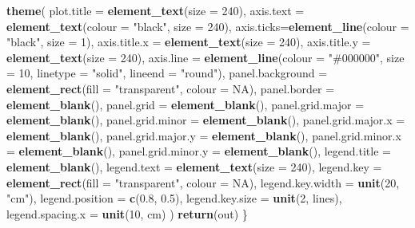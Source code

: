 \documentclass[
]{article}
\newenvironment{Shaded}{\begin{snugshade}}{\end{snugshade}}
\newcommand{\AttributeTok}[1]{\textcolor[rgb]{0.13,0.29,0.53}{#1}}
\newcommand{\ConstantTok}[1]{\textcolor[rgb]{0.56,0.35,0.01}{#1}}
\newcommand{\DecValTok}[1]{\textcolor[rgb]{0.00,0.00,0.81}{#1}}
\newcommand{\FloatTok}[1]{\textcolor[rgb]{0.00,0.00,0.81}{#1}}
\newcommand{\FunctionTok}[1]{\textcolor[rgb]{0.13,0.29,0.53}{\textbf{#1}}}
\newcommand{\NormalTok}[1]{#1}
\newcommand{\StringTok}[1]{\textcolor[rgb]{0.31,0.60,0.02}{#1}}
\begin{document}
\begin{Shaded}
\begin{Highlighting}[]
    \FunctionTok{theme}\NormalTok{(}
      \AttributeTok{plot.title =} \FunctionTok{element\_text}\NormalTok{(}\AttributeTok{size =} \DecValTok{240}\NormalTok{),}
      \AttributeTok{axis.text =} \FunctionTok{element\_text}\NormalTok{(}\AttributeTok{colour =} \StringTok{"black"}\NormalTok{, }\AttributeTok{size =} \DecValTok{240}\NormalTok{),}
      \AttributeTok{axis.ticks=}\FunctionTok{element\_line}\NormalTok{(}\AttributeTok{colour =} \StringTok{"black"}\NormalTok{, }\AttributeTok{size =} \DecValTok{1}\NormalTok{),}
      \AttributeTok{axis.title.x =} \FunctionTok{element\_text}\NormalTok{(}\AttributeTok{size =} \DecValTok{240}\NormalTok{),}
      \AttributeTok{axis.title.y =} \FunctionTok{element\_text}\NormalTok{(}\AttributeTok{size =} \DecValTok{240}\NormalTok{),}
      \AttributeTok{axis.line =} \FunctionTok{element\_line}\NormalTok{(}\AttributeTok{colour =} \StringTok{"\#000000"}\NormalTok{, }
                    \AttributeTok{size =} \DecValTok{10}\NormalTok{, }\AttributeTok{linetype =} \StringTok{"solid"}\NormalTok{, }\AttributeTok{lineend =} \StringTok{"round"}\NormalTok{),}
      \AttributeTok{panel.background =} \FunctionTok{element\_rect}\NormalTok{(}\AttributeTok{fill =} \StringTok{"transparent"}\NormalTok{, }\AttributeTok{colour =} \ConstantTok{NA}\NormalTok{),}
      \AttributeTok{panel.border =} \FunctionTok{element\_blank}\NormalTok{(),}
      \AttributeTok{panel.grid =} \FunctionTok{element\_blank}\NormalTok{(),}
      \AttributeTok{panel.grid.major =} \FunctionTok{element\_blank}\NormalTok{(),}
      \AttributeTok{panel.grid.minor =} \FunctionTok{element\_blank}\NormalTok{(),}
      \AttributeTok{panel.grid.major.x =} \FunctionTok{element\_blank}\NormalTok{(),}
      \AttributeTok{panel.grid.major.y =} \FunctionTok{element\_blank}\NormalTok{(),}
      \AttributeTok{panel.grid.minor.x =} \FunctionTok{element\_blank}\NormalTok{(),}
      \AttributeTok{panel.grid.minor.y =} \FunctionTok{element\_blank}\NormalTok{(),}
      \AttributeTok{legend.title =} \FunctionTok{element\_blank}\NormalTok{(),}
      \AttributeTok{legend.text =} \FunctionTok{element\_text}\NormalTok{(}\AttributeTok{size =} \DecValTok{240}\NormalTok{),}
      \AttributeTok{legend.key =} \FunctionTok{element\_rect}\NormalTok{(}\AttributeTok{fill =} \StringTok{"transparent"}\NormalTok{, }\AttributeTok{colour =} \ConstantTok{NA}\NormalTok{),}
      \AttributeTok{legend.key.width =} \FunctionTok{unit}\NormalTok{(}\DecValTok{20}\NormalTok{, }\StringTok{"cm"}\NormalTok{),}
      \AttributeTok{legend.position =} \FunctionTok{c}\NormalTok{(}\FloatTok{0.8}\NormalTok{, }\FloatTok{0.5}\NormalTok{),}
      \AttributeTok{legend.key.size =} \FunctionTok{unit}\NormalTok{(}\DecValTok{2}\NormalTok{, }\StringTok{\textquotesingle{}lines\textquotesingle{}}\NormalTok{),}
      \AttributeTok{legend.spacing.x =} \FunctionTok{unit}\NormalTok{(}\DecValTok{10}\NormalTok{, }\StringTok{\textquotesingle{}cm\textquotesingle{}}\NormalTok{)}
\NormalTok{    )}
  \FunctionTok{return}\NormalTok{(out)}
\NormalTok{\}}
\end{Highlighting}
\end{Shaded}
\end{document}
